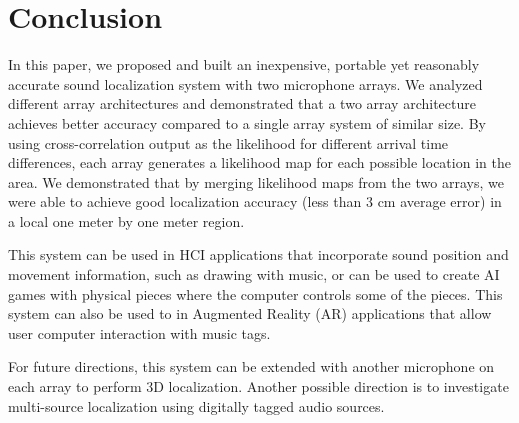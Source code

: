 \chapter{Conclusion}
In this paper, we proposed and built an inexpensive, portable yet reasonably accurate sound localization system with two microphone arrays. We analyzed different array architectures and demonstrated that a two array architecture achieves better accuracy compared to a single array system of similar size. By using cross-correlation output as the likelihood for different arrival time differences, each array generates a likelihood map for each possible location in the area. We demonstrated that by merging likelihood maps from the two arrays, we were able to achieve good localization accuracy (less than $3$ cm average error) in a local one meter by one meter region.

This system can be used in HCI applications that incorporate sound position and movement information, such as drawing with music, or can be used to create AI games with physical pieces where the computer controls some of the pieces. This system can also be used to in Augmented Reality (AR) applications that allow user computer interaction with music tags.

For future directions, this system can be extended with another microphone on each array to perform 3D localization. Another possible direction is to investigate multi-source localization using digitally tagged audio sources.
